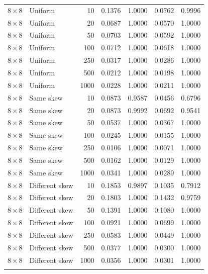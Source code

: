 \begin{longtable}{@{}llrrrrr@{}}
\(8\times8\) & Uniform & 10 & 0.1376 & 1.0000 & 0.0762 & 0.9996 \\
\(8\times8\) & Uniform & 20 & 0.0687 & 1.0000 & 0.0570 & 1.0000 \\
\(8\times8\) & Uniform & 50 & 0.0703 & 1.0000 & 0.0592 & 1.0000 \\
\(8\times8\) & Uniform & 100 & 0.0712 & 1.0000 & 0.0618 & 1.0000 \\
\(8\times8\) & Uniform & 250 & 0.0317 & 1.0000 & 0.0286 & 1.0000 \\
\(8\times8\) & Uniform & 500 & 0.0212 & 1.0000 & 0.0198 & 1.0000 \\
\(8\times8\) & Uniform & 1000 & 0.0228 & 1.0000 & 0.0211 & 1.0000 \\
\addlinespace
\(8\times8\) & Same skew & 10 & 0.0873 & 0.9587 & 0.0456 & 0.6796 \\
\(8\times8\) & Same skew & 20 & 0.0873 & 0.9992 & 0.0692 & 0.9541 \\
\(8\times8\) & Same skew & 50 & 0.0537 & 1.0000 & 0.0367 & 1.0000 \\
\(8\times8\) & Same skew & 100 & 0.0245 & 1.0000 & 0.0155 & 1.0000 \\
\(8\times8\) & Same skew & 250 & 0.0106 & 1.0000 & 0.0071 & 1.0000 \\
\(8\times8\) & Same skew & 500 & 0.0162 & 1.0000 & 0.0129 & 1.0000 \\
\(8\times8\) & Same skew & 1000 & 0.0341 & 1.0000 & 0.0289 & 1.0000 \\
\addlinespace
\(8\times8\) & Different skew & 10 & 0.1853 & 0.9897 & 0.1035 & 0.7912 \\
\(8\times8\) & Different skew & 20 & 0.1803 & 1.0000 & 0.1432 & 0.9759 \\
\(8\times8\) & Different skew & 50 & 0.1391 & 1.0000 & 0.1080 & 1.0000 \\
\(8\times8\) & Different skew & 100 & 0.0921 & 1.0000 & 0.0699 & 1.0000 \\
\(8\times8\) & Different skew & 250 & 0.0583 & 1.0000 & 0.0449 & 1.0000 \\
\(8\times8\) & Different skew & 500 & 0.0377 & 1.0000 & 0.0300 & 1.0000 \\
\(8\times8\) & Different skew & 1000 & 0.0356 & 1.0000 & 0.0301 & 1.0000 \\
\addlinespace
\bottomrule\end{longtable}
\endgroup
